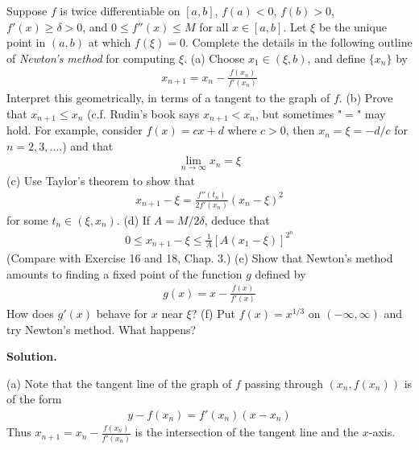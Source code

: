 \documentclass[12pt]{article}
\theoremstyle{definition}
\begin{document}
Suppose $f$ is twice differentiable on $[a,b]$, $f(a)<0$, $f(b)>0$, $f'(x)\ge\delta>0$, and $0\le f''(x)\le M$ for all $x\in[a,b]$. Let $\xi$ be the unique point in $(a,b)$ at which $f(\xi)=0$.
Complete the details in the following outline of \textit{Newton's method} for computing $\xi$.
(a) Choose $x_1\in(\xi,b)$, and define $\{x_n\}$ by
\begin{align*}
x_{n+1}=x_n-\frac{f(x_n)}{f'(x_n)}
\end{align*}
Interpret this geometrically, in terms of a tangent to the graph of $f$.
(b) Prove that $x_{n+1}\le x_n$ (c.f. Rudin's book says $x_{n+1}<x_n$, but sometimes "$=$" may hold. For example, consider $f(x)=cx+d$ where $c>0$, then $x_n=\xi=-d/c$ for $n=2,3,\ldots$.) and that
\begin{align*}
\lim_{n\to\infty}x_n=\xi
\end{align*}
(c) Use Taylor's theorem to show that
\begin{align*}
x_{n+1}-\xi=\frac{f''(t_n)}{2f'(x_n)}\left(x_n-\xi\right)^2
\end{align*}
for some $t_n\in(\xi,x_n)$.
(d) If $A=M/2\delta$, deduce that
\begin{align*}
0\le x_{n+1}-\xi\le\frac{1}{A}\left[A\left(x_1-\xi\right)\right]^{2^n}
\end{align*}
(Compare with Exercise 16 and 18, Chap. 3.)
(e) Show that Newton's method amounts to finding a fixed point of the function $g$ defined by
\begin{align*}
g(x)=x-\frac{f(x)}{f'(x)}
\end{align*}
How does $g'(x)$ behave for $x$ near $\xi$?
(f) Put $f(x)=x^{1/3}$ on $(-\infty,\infty)$ and try Newton's method. What happens?

\smallskip
\noindent\textbf{Solution.}\quad

(a) Note that the tangent line of the graph of $f$ passing through $(x_n,f(x_n))$ is of the form
\begin{align*}
y-f(x_n)=f'(x_n)\left(x-x_n\right)
\end{align*}
Thus $x_{n+1}=x_n-\frac{f(x_n)}{f'(x_n)}$ is the intersection of the tangent line and the $x$-axis.
\end{document}
